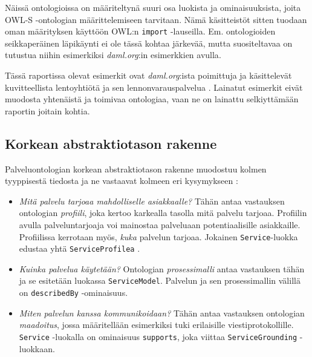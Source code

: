 \documentclass[finnish]{tktltiki2}
\theoremstyle{definition}
\theoremstyle{remark}
\begin{document}
Näissä ontologioissa on määriteltynä suuri osa luokista ja ominaisuuksista, joita OWL-S -ontologian määrittelemiseen tarvitaan. Nämä käsitteistöt sitten tuodaan oman määrityksen käyttöön OWL:n \texttt{import} -lauseilla. 
Em. ontologioiden seikkaperäinen läpikäynti ei ole tässä kohtaa järkevää, mutta suositeltavaa on tutustua niihin esimerkiksi \textit{daml.org}:in esimerkkien avulla\cite{daml}. 

Tässä raportissa olevat esimerkit ovat \textit{daml.org}:ista poimittuja ja käsittelevät kuvitteellista lentoyhtiötä ja sen lennonvarauspalvelua \cite{daml}. Lainatut esimerkit eivät muodosta yhtenäistä ja toimivaa ontologiaa, vaan ne on lainattu selkiyttämään raportin joitain kohtia.  

\subsection{Korkean abstraktiotason rakenne}

Palveluontologian korkean abstraktiotason rakenne muodostuu kolmen tyyppisestä tiedosta ja ne vastaavat kolmeen eri kysymykseen \cite{OWLS}:

\begin{itemize}

  \item \textit{Mitä palvelu tarjoaa mahdolliselle asiakkaalle?} Tähän antaa vastauksen ontologian \textit{profiili}, joka kertoo karkealla tasolla mitä palvelu tarjoaa. Profiilin 
 avulla palveluntarjoaja voi mainostaa palveluaan potentiaalisille asiakkaille. Profiilissa kerrotaan myös, \textit{kuka} palvelun tarjoaa. Jokainen \texttt{Service}-luokka edustaa yhtä \texttt{ServiceProfilea} \cite{OWLS}.
 
 \item \textit{Kuinka palvelua käytetään?} Ontologian \textit{prosessimalli} antaa vastauksen tähän ja se esitetään luokassa \texttt{ServiceModel}. Palvelun ja sen prosessimallin 
 välillä on \texttt{describedBy} -ominaisuus\cite{OWLS}. 
 
 \item \textit{Miten palvelun kanssa kommunikoidaan?} Tähän antaa vastauksen ontologian \textit{maadoitus}, jossa määritellään esimerkiksi tuki erilaisille viestiprotokollille. 
 \texttt{Service} -luokalla on ominaisuus \texttt{supports}, joka viittaa \texttt{ServiceGrounding} -luokkaan\cite{OWLS}.  
  
\end{itemize}
\end{document}

